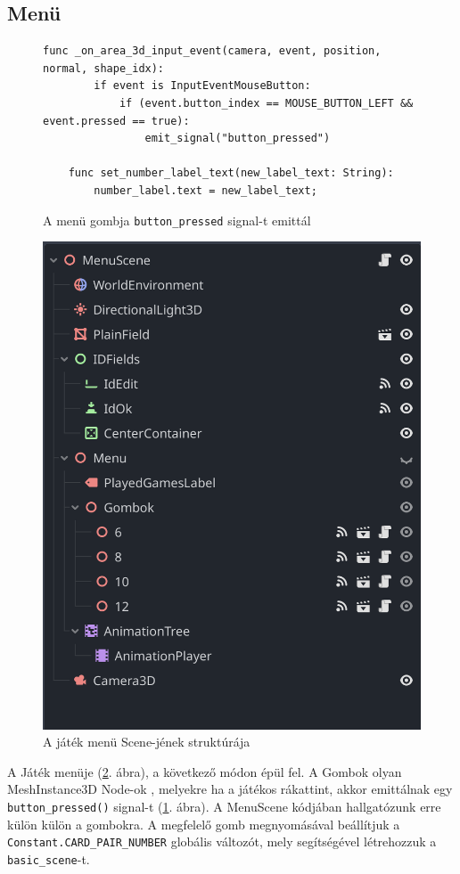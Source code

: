 \subsection{Menü}
\begin{figure}
    \centering
    \begin{lstlisting}[language=GDScript]
    func _on_area_3d_input_event(camera, event, position, normal, shape_idx):
        if event is InputEventMouseButton:
            if (event.button_index == MOUSE_BUTTON_LEFT && event.pressed == true):
                emit_signal("button_pressed")
    
    func set_number_label_text(new_label_text: String):
        number_label.text = new_label_text;
    \end{lstlisting}
    \caption{A menü gombja  \lstinline{button_pressed} signal-t emittál}
    \label{code:button_pressed_signal}
\end{figure}
\begin{figure}
    \centering
    \includegraphics[width=\textwidth]{img/menu_scene_tree.png}
    \caption{A játék menü Scene-jének struktúrája}
    \label{img:menu_scene}  
\end{figure}
A Játék menüje (\ref{img:menu_scene}. ábra), a következő módon épül fel. A Gombok olyan MeshInstance3D Node-ok \cite{godotengineMeshInstance3D}, melyekre ha a játékos rákattint, akkor emittálnak egy \lstinline{button_pressed()} signal-t (\ref{code:button_pressed_signal}. ábra).
A MenuScene kódjában hallgatózunk erre külön külön a gombokra. A megfelelő gomb megnyomásával beállítjuk a \lstinline{Constant.CARD_PAIR_NUMBER} globális változót, mely segítségével létrehozzuk a \lstinline{basic_scene}-t.

